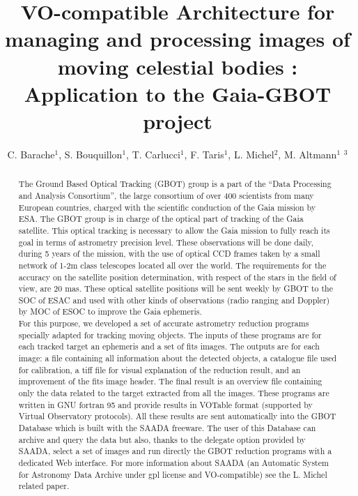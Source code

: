 \documentclass[11pt,twoside]{article}
\begin{document}
\title{VO-compatible Architecture for managing and processing images of moving celestial bodies : Application to the Gaia-GBOT project}
\author{C. Barache$^1$, S. Bouquillon$^1$, T. Carlucci$^1$, F. Taris$^1$, L. Michel$^2$, M. Altmann$^1$ $^3$\\
}

\begin{abstract}
The Ground Based Optical Tracking (GBOT) group is a part of the “Data Processing and Analysis Consortium”, the large consortium of over 400 scientists from many European countries, charged with the scientific conduction of the Gaia mission by ESA. The GBOT group is in charge of the optical part of tracking of the Gaia satellite. This optical tracking is necessary to allow the Gaia mission to fully reach its goal in terms of astrometry precision level.  These observations will be done daily, during 5 years of the mission, with the use of optical CCD frames taken by a small network of 1-2m class telescopes located all over the world. The requirements for the accuracy on the satellite position determination, with respect of the stars in the field of view, are 20 mas. 
These optical satellite positions will be sent weekly by GBOT to the SOC of ESAC and used with other kinds of observations (radio ranging and Doppler) by MOC of ESOC to improve the Gaia ephemeris.\\ 
\hspace*{0.5cm}For this purpose, we developed a set of accurate astrometry reduction programs specially adapted for tracking moving objects. The inputs of these programs are for each tracked target an ephemeris and a set of fits images. The outputs are for each image: a file containing all information about the detected objects, a catalogue file used for calibration, a tiff file for visual explanation of the reduction result, and an improvement of the fits image header. The final result is an overview file containing only the data related to the target extracted from all the images. These programs are written in GNU fortran 95 and provide results in VOTable format (supported by Virtual Observatory protocols). All these results are sent automatically into the GBOT Database which is built with the SAADA freeware. The user of this Database can archive and query the data but also, thanks to the delegate option provided by SAADA, select a set of images and run directly the GBOT reduction programs with a dedicated Web interface. For more information about SAADA (an Automatic System for Astronomy Data Archive under gpl license and VO‑compatible) see the L. Michel related paper.
\end{abstract}
\end{document}

